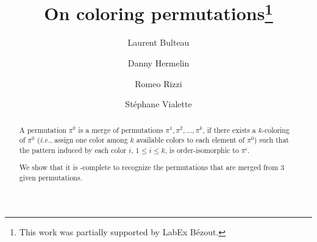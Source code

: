 \documentclass[a4paper,UKenglish,cleveref,autoref,thm-restate]{lipics-v2021}
\title{On coloring permutations\footnote{This work was partially supported by LabEx Bézout.}}
\author{Laurent Bulteau}{LIGM, Univ Gustave Eiffel, CNRS, 77454 Marne-la-Vallée, France}{laurent.bulteau@univ-eiffel.fr}{}{}
\author{Danny Hermelin}{Ben-Gurion University of the Negev, Israel}{hermelin@bgu.ac.il}{}{}
\author{Romeo Rizzi}{Computer Science Department, University of Verona, Verona, Italy}{romeo.rizzi@univr.it}{}{}
\author{Stéphane Vialette}{LIGM, Univ Gustave Eiffel, CNRS, 77454 Marne-la-Vallée, France}{stephane.vialette@univ-eiffel.fr}{}{}
\begin{document}

\maketitle

\begin{abstract}
  A permutation $\pi^0$ is a merge of permutations 
  $\pi^1, \pi^2, \dots, \pi^k$, 
  if there exists a $k$-coloring of $\pi^0$ (\emph{i.e.}, assign one color
  among $k$ available colors to each element of $\pi^0$) such that the
  pattern induced by each color $i$, $1 \leq i \leq k$, is order-isomorphic
  to $\pi^i$.

  We show that it is \NP-complete to recognize the permutations that are merged
  from $3$ given permutations.
\end{abstract}







%








%


\end{document}

